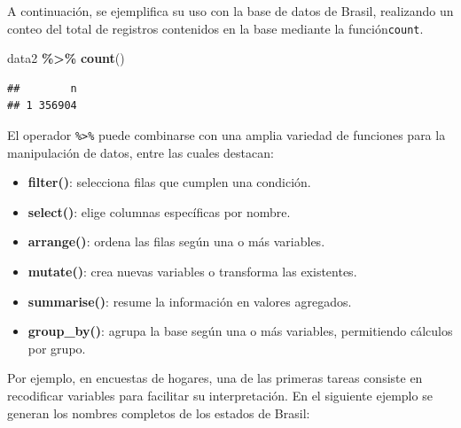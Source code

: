 \documentclass[
  spanish,
  12pt,
]{book}
\newenvironment{Shaded}{\begin{snugshade}}{\end{snugshade}}
\newcommand{\FunctionTok}[1]{\textcolor[rgb]{0.13,0.29,0.53}{\textbf{#1}}}
\newcommand{\NormalTok}[1]{#1}
\newcommand{\SpecialCharTok}[1]{\textcolor[rgb]{0.81,0.36,0.00}{\textbf{#1}}}
\providecommand{\tightlist}{%
  \setlength{\itemsep}{0pt}\setlength{\parskip}{0pt}}
\begin{document}
A continuación, se ejemplifica su uso con la base de datos de Brasil, realizando un conteo del total de registros contenidos en la base mediante la función\texttt{count}.

\begin{Shaded}
\begin{Highlighting}[]
\NormalTok{data2 }\SpecialCharTok{\%\textgreater{}\%} \FunctionTok{count}\NormalTok{()}
\end{Highlighting}
\end{Shaded}

\begin{verbatim}
##        n
## 1 356904
\end{verbatim}

El operador \texttt{\%\textgreater{}\%} puede combinarse con una amplia variedad de funciones para la manipulación de datos, entre las cuales destacan:

\begin{itemize}
\tightlist
\item
  \textbf{filter()}: selecciona filas que cumplen una condición.
\item
  \textbf{select()}: elige columnas específicas por nombre.
\item
  \textbf{arrange()}: ordena las filas según una o más variables.
\item
  \textbf{mutate()}: crea nuevas variables o transforma las existentes.
\item
  \textbf{summarise()}: resume la información en valores agregados.
\item
  \textbf{group\_by()}: agrupa la base según una o más variables, permitiendo cálculos por grupo.
\end{itemize}

Por ejemplo, en encuestas de hogares, una de las primeras tareas consiste en recodificar variables para facilitar su interpretación. En el siguiente ejemplo se generan los nombres completos de los estados de Brasil:
\end{document}
